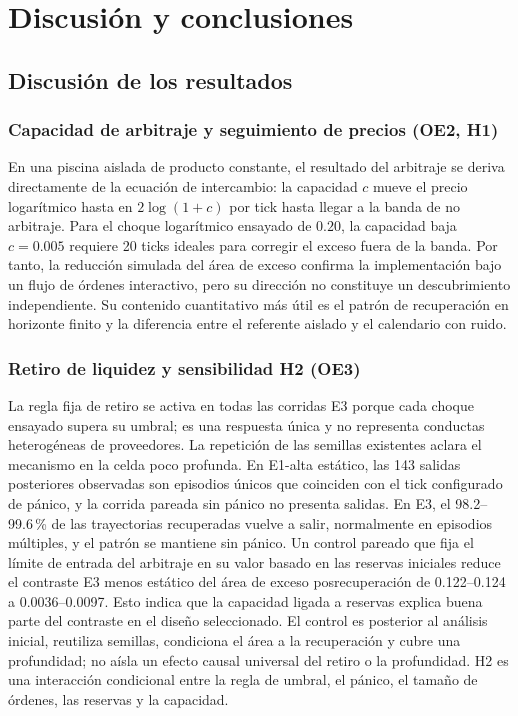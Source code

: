 \chapter{Discusión y conclusiones}
\label{cap:discusion}

\section{Discusión de los resultados}

\subsection{Capacidad de arbitraje y seguimiento de precios (OE2, H1)}

En una piscina aislada de producto constante, el resultado del arbitraje se deriva directamente de la ecuación de intercambio: la capacidad $c$ mueve el precio logarítmico hasta en $2\log(1+c)$ por tick hasta llegar a la banda de no arbitraje. Para el choque logarítmico ensayado de $0.20$, la capacidad baja $c=0.005$ requiere 20 ticks ideales para corregir el exceso fuera de la banda. Por tanto, la reducción simulada del área de exceso confirma la implementación bajo un flujo de órdenes interactivo, pero su dirección no constituye un descubrimiento independiente. Su contenido cuantitativo más útil es el patrón de recuperación en horizonte finito y la diferencia entre el referente aislado y el calendario con ruido.

\subsection{Retiro de liquidez y sensibilidad H2 (OE3)}

La regla fija de retiro se activa en todas las corridas E3 porque cada choque ensayado supera su umbral; es una respuesta única y no representa conductas heterogéneas de proveedores. La repetición de las semillas existentes aclara el mecanismo en la celda poco profunda. En E1-alta estático, las 143 salidas posteriores observadas son episodios únicos que coinciden con el tick configurado de pánico, y la corrida pareada sin pánico no presenta salidas. En E3, el 98.2--99.6\,\% de las trayectorias recuperadas vuelve a salir, normalmente en episodios múltiples, y el patrón se mantiene sin pánico. Un control pareado que fija el límite de entrada del arbitraje en su valor basado en las reservas iniciales reduce el contraste E3 menos estático del área de exceso posrecuperación de 0.122--0.124 a 0.0036--0.0097. Esto indica que la capacidad ligada a reservas explica buena parte del contraste en el diseño seleccionado. El control es posterior al análisis inicial, reutiliza semillas, condiciona el área a la recuperación y cubre una profundidad; no aísla un efecto causal universal del retiro o la profundidad. H2 es una interacción condicional entre la regla de umbral, el pánico, el tamaño de órdenes, las reservas y la capacidad.

